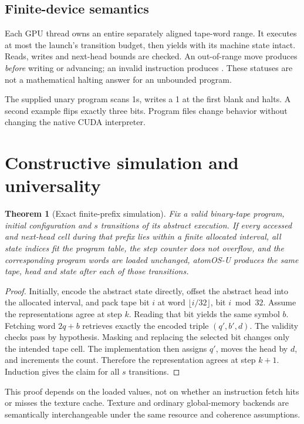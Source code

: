 \documentclass[11pt,a4paper]{article}
\newcommand{\code}[1]{\texttt{\detokenize{#1}}}
\newtheorem{theorem}{Theorem}[section]
\begin{document}
\subsection{Finite-device semantics}
Each GPU thread owns an entire separately aligned tape-word range. It executes at most the launch's transition budget, then yields with its machine state intact. Reads, writes and next-head bounds are checked. An out-of-range move produces \code{TapeExhausted} \emph{before} writing or advancing; an invalid instruction produces \code{BadProgram}. These statuses are not a mathematical halting answer for an unbounded program.

The supplied unary program scans 1s, writes a 1 at the first blank and halts. A second example flips exactly three bits. Program files change behavior without changing the native CUDA interpreter.
\clearpage

\section{Constructive simulation and universality}
\begin{theorem}[Exact finite-prefix simulation]
Fix a valid binary-tape program, initial configuration and $s$ transitions of its abstract execution. If every accessed and next-head cell during that prefix lies within a finite allocated interval, all state indices fit the program table, the step counter does not overflow, and the corresponding program words are loaded unchanged, atomOS-U produces the same tape, head and state after each of those transitions.
\end{theorem}
\begin{proof}
Initially, encode the abstract state directly, offset the abstract head into the allocated interval, and pack tape bit $i$ at word $\lfloor i/32\rfloor$, bit $i\bmod32$. Assume the representations agree at step $k$. Reading that bit yields the same symbol $b$. Fetching word $2q+b$ retrieves exactly the encoded triple $(q',b',d)$. The validity checks pass by hypothesis. Masking and replacing the selected bit changes only the intended tape cell. The implementation then assigns $q'$, moves the head by $d$, and increments the count. Therefore the representation agrees at step $k+1$. Induction gives the claim for all $s$ transitions.
\end{proof}

This proof depends on the loaded values, not on whether an instruction fetch hits or misses the texture cache. Texture and ordinary global-memory backends are semantically interchangeable under the same resource and coherence assumptions.
\end{document}
